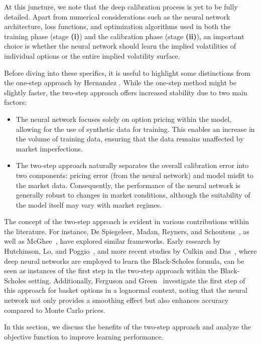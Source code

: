 \documentclass{article}
\theoremstyle{remark}
\begin{document}
At this juncture, we note that the deep calibration process is yet to be fully detailed. Apart from numerical considerations such as the neural network architecture, loss functions, and optimization algorithms used in both the training phase (stage \textbf{(i)}) and the calibration phase (stage \textbf{(ii)}), an important choice is whether the neural network should learn the implied volatilities of individual options or the entire implied volatility surface.

Before diving into these specifics, it is useful to highlight some distinctions from the one-step approach by Hernandez \cite{Hernandez}. While the one-step method might be slightly faster, the two-step approach offers increased stability due to two main factors:

\begin{itemize}
\item The neural network focuses solely on option pricing within the model, allowing for the use of synthetic data for training. This enables an increase in the volume of training data, ensuring that the data remains unaffected by market imperfections.
\item The two-step approach naturally separates the overall calibration error into two components: pricing error (from the neural network) and model misfit to the market data. Consequently, the performance of the neural network is generally robust to changes in market conditions, although the suitability of the model itself may vary with market regimes.
\end{itemize}

The concept of the two-step approach is evident in various contributions within the literature.
For instance, De Spiegeleer, Madan, Reyners, and Schoutens~\cite{MadanSchoutens},
as well as McGhee~\cite{McGhee}, have explored similar frameworks.
Early research by Hutchinson, Lo, and Poggio~\cite{Hutchison94},
and more recent studies by Culkin and Das~\cite{CulcinDas17},
where deep neural networks are employed to learn the Black-Scholes formula,
can be seen as instances of the first step in the two-step approach within the Black-Scholes setting.
Additionally, Ferguson and Green~\cite{FG18} investigate the first step of this approach for basket options
in a lognormal context, noting that the neural network not only provides a smoothing effect but also enhances
accuracy compared to Monte Carlo prices.

In this section, we discuss the benefits of the two-step approach
and analyze the objective function to improve learning performance.
\end{document}
